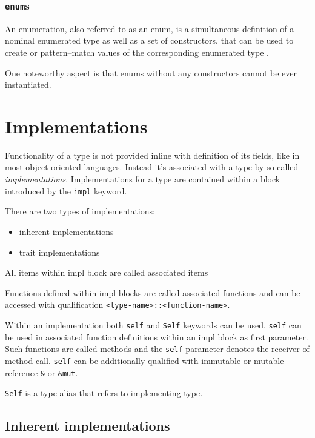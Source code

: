 \subsubsection{\texttt{enum}s}

An enumeration, also referred to as an enum, is a simultaneous definition of a nominal enumerated type as well as a set of constructors, 
that can be used to create or pattern--match values of the corresponding enumerated type \cite{rustreference}.

One noteworthy aspect is that enums without any constructors cannot be ever instantiated.

\section{Implementations}

Functionality of a type is not provided inline with definition of its fields, like in most object oriented languages.
Instead it's associated with a type by so called \textit{implementations}.
Implementations for a type are contained within a block introduced by the \texttt{impl} keyword.

There are two types of implementations:
\begin{itemize}
    \item inherent implementations
    \item trait implementations
\end{itemize}

All items within impl block are called associated items

Functions defined within impl blocks are called associated functions and can be accessed with qualification \texttt{<type-name>::<function-name>}.

Within an implementation both \texttt{self} and \texttt{Self} keywords can be used.
\texttt{self} can be used in associated function definitions within an impl block as first parameter. 
Such functions are called methods and the \texttt{self} parameter denotes the receiver of method call. 
\texttt{self} can be additionally qualified with immutable or mutable reference \texttt{\&} or \texttt{\&mut}.

\texttt{Self} is a type alias that refers to implementing type.

\subsection{Inherent implementations}

